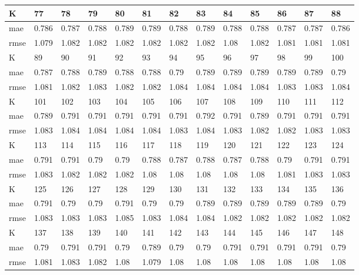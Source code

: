 \begin{appendices}
\begin{center}
\begin{tabularx}{\textwidth}{|l|X|X|X|X|X|X|X|X|X|X|X|X|}
		\hline 
		K & 77 & 78 & 79 & 80 & 81 & 82 & 83 & 84 & 85 & 86 & 87 & 88 \\ \hline 
		mae & 0.786 & 0.787 & 0.788 & 0.789 & 0.789 & 0.788 & 0.789 & 0.788 & 0.788 & 0.787 & 0.787 & 0.786 \\ \hline 
		rmse & 1.079 & 1.082 & 1.082 & 1.082 & 1.082 & 1.082 & 1.082 & 1.08 & 1.082 & 1.081 & 1.081 & 1.081 \\ \hline 
		\hline 
		K & 89 & 90 & 91 & 92 & 93 & 94 & 95 & 96 & 97 & 98 & 99 & 100 \\ \hline 
		mae & 0.787 & 0.788 & 0.789 & 0.788 & 0.788 & 0.79 & 0.789 & 0.789 & 0.789 & 0.789 & 0.789 & 0.79 \\ \hline 
		rmse & 1.081 & 1.082 & 1.083 & 1.082 & 1.082 & 1.084 & 1.084 & 1.084 & 1.084 & 1.083 & 1.083 & 1.084 \\ \hline 
		\hline 
		K & 101 & 102 & 103 & 104 & 105 & 106 & 107 & 108 & 109 & 110 & 111 & 112 \\ \hline 
		mae & 0.789 & 0.791 & 0.791 & 0.791 & 0.791 & 0.791 & 0.792 & 0.791 & 0.789 & 0.791 & 0.791 & 0.791 \\ \hline 
		rmse & 1.083 & 1.084 & 1.084 & 1.084 & 1.084 & 1.083 & 1.084 & 1.083 & 1.082 & 1.082 & 1.083 & 1.083 \\ \hline 
		\hline 
		K & 113 & 114 & 115 & 116 & 117 & 118 & 119 & 120 & 121 & 122 & 123 & 124 \\ \hline 
		mae & 0.791 & 0.791 & 0.79 & 0.79 & 0.788 & 0.787 & 0.788 & 0.787 & 0.788 & 0.79 & 0.791 & 0.791 \\ \hline 
		rmse & 1.083 & 1.082 & 1.082 & 1.082 & 1.08 & 1.08 & 1.08 & 1.08 & 1.08 & 1.081 & 1.083 & 1.083 \\ \hline 
		\hline 
		K & 125 & 126 & 127 & 128 & 129 & 130 & 131 & 132 & 133 & 134 & 135 & 136 \\ \hline 
		mae & 0.791 & 0.79 & 0.79 & 0.791 & 0.79 & 0.79 & 0.789 & 0.789 & 0.789 & 0.789 & 0.789 & 0.79 \\ \hline 
		rmse & 1.083 & 1.083 & 1.083 & 1.085 & 1.083 & 1.084 & 1.084 & 1.082 & 1.082 & 1.082 & 1.082 & 1.082 \\ \hline 
		\hline 
		K & 137 & 138 & 139 & 140 & 141 & 142 & 143 & 144 & 145 & 146 & 147 & 148 \\ \hline 
		mae & 0.79 & 0.791 & 0.791 & 0.79 & 0.789 & 0.79 & 0.79 & 0.791 & 0.791 & 0.791 & 0.791 & 0.79 \\ \hline 
		rmse & 1.081 & 1.083 & 1.082 & 1.08 & 1.079 & 1.08 & 1.08 & 1.08 & 1.08 & 1.08 & 1.08 & 1.08 \\ \hline 
	\end{tabularx} 
\end{center}

\end{appendices}
